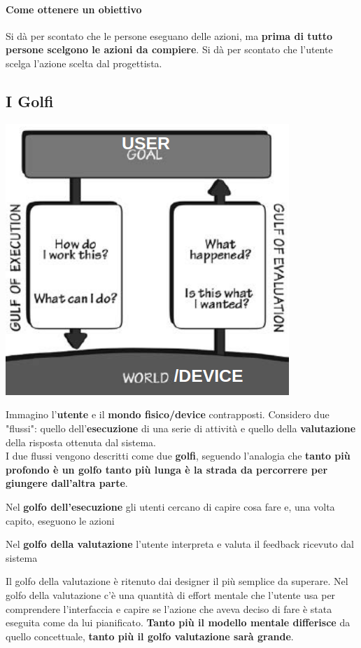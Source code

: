 \documentclass[10pt]{article}
\begin{document}
\paragraph{Come ottenere un obiettivo} Si dà per scontato che le persone eseguano delle azioni, ma \textbf{prima di tutto persone scelgono le azioni da compiere}. Si dà per scontato che l'utente scelga l'azione scelta dal progettista.
\subsection{I Golfi}
\begin{multicols}{2}
\includegraphics[scale=0.6]{golfi.png}
\columnbreak


Immagino l'\textbf{utente} e il \textbf{mondo fisico/device} contrapposti. Considero due "flussi": quello dell'\textbf{esecuzione} di una serie di attività e quello della \textbf{valutazione} della risposta ottenuta dal sistema.\\
I due flussi vengono descritti come due \textbf{golfi}, seguendo l'analogia che \textbf{tanto più profondo è un golfo tanto più lunga è la strada da percorrere per giungere dall'altra parte}.
\begin{list}{-}{}
\item Nel \textbf{golfo dell'esecuzione} gli utenti cercano di capire cosa fare e, una volta capito, eseguono le azioni
\item Nel \textbf{golfo della valutazione} l'utente interpreta e valuta il feedback ricevuto dal sistema
\end{list}
Il golfo della valutazione è ritenuto dai designer il più semplice da superare. Nel golfo della valutazione c'è una quantità di effort mentale che l'utente usa per comprendere l'interfaccia e capire se l'azione che aveva deciso di fare è stata eseguita come da lui pianificato. \textbf{Tanto più il modello mentale differisce} da quello concettuale, \textbf{tanto più il golfo valutazione sarà grande}.
\end{multicols}
\end{document}
